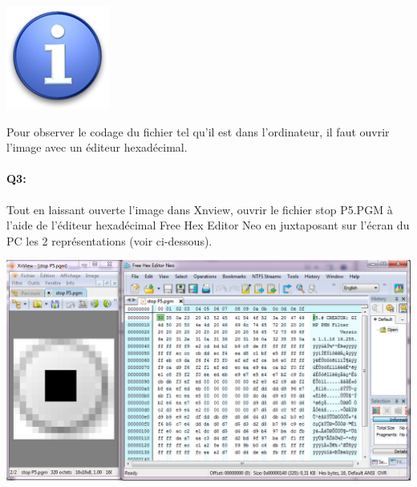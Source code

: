 \documentclass{article}
\begin{document}
\begin{minipage}[b]{.08\linewidth}
	\includegraphics[width=\linewidth]{./figures/info.png}
\end{minipage}
\hfill
\begin{minipage}[b]{.85\linewidth}
	Pour observer le codage du fichier tel qu’il est dans l’ordinateur, il faut ouvrir l’image avec	un éditeur hexadécimal.
	\vspace{.7em}
\end{minipage}

\paragraph{Q3:}
Tout en laissant ouverte l'image dans Xnview, ouvrir le fichier \og{}stop P5.PGM\fg{}
à l'aide de l’éditeur hexadécimal \og{}Free Hex Editor Neo\fg{} en juxtaposant sur l'écran du PC les 2 représentations (voir ci-dessous).

\begin{center}
	\includegraphics[width=.8\linewidth]{./figures/pic_hex.png}
\end{center}
\end{document}
